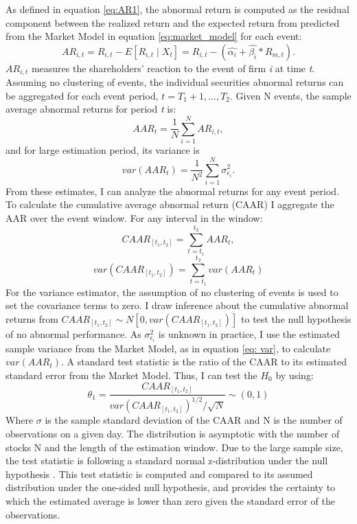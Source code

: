 As defined in equation \ref{eq:AR1}, the abnormal return is computed as the residual component between the realized return and the expected return from predicted from the Market Model in equation \ref{eq:market_model} for each event:
 \begin{equation}
    AR_{i,t} = R_{i,t} - E[R_{i,t} \mid X_t ] =  R_{i,t} - (\hat{\alpha_i} + \hat{\beta_i} * R_{m,t}).
    \label{eq: AR}
 \end{equation} 
$AR_{i,t}$ measures the shareholders' reaction to the event of firm \textit{i} at time \textit{t}. Assuming no clustering of events, the individual securities abnormal returns can be aggregated for each event period, $t = T_1 + 1, ..., T_2.$ Given N events, the sample average abnormal returns for period \textit{t} is:  
 \begin{equation}
 AAR_t = \frac{1}{N} \sum_{i=1} ^N AR_{i,t},
 \label{eq: AAR}
 \end{equation}
 and for large estimation period, its variance is
 \begin{equation}
 var(AAR_{t}) = \frac{1}{N^2} \sum_{i=1} ^N \sigma_{\epsilon_i} ^2.
  \label{eq: var}
 \end{equation}
From these estimates, I can analyze the abnormal returns for any event period. To calculate the cumulative average abnormal return (CAAR) I aggregate the AAR over the event window. For any interval in the window:
 \begin{equation}
 CAAR_{[t_1,t_2]} = \sum_{t = t_1} ^{t_2} AAR_{t},
 \label{eq: CAAR}
 \end{equation}
 \begin{equation}
 var(CAAR_{[t_1,t_2]}) = \sum^{t_2}_{t = t_1} var(AAR_{t})
 \end{equation} 
For the variance estimator, the assumption of no clustering of events is used to set the covariance terms to zero. I draw inference about the cumulative abnormal returns from $CAAR_{[t_1,t_2]} \sim N[0, var(CAAR_{[t_1,t_2]})]$ to test the null hypothesis of no abnormal performance. As $\sigma_{\epsilon_i} ^2$ is unknown in practice, I use the estimated sample variance from the Market Model, as in equation \ref{eq: var}, to calculate $ var(AAR_{t})$. A standard test statistic is the ratio of the CAAR to its estimated standard error from the Market Model. Thus, I can test the $H_0$ by using: 
 \begin{equation}
 \theta_1 = \frac{ CAAR_{[t_1,t_2]} }{ {var(CAAR_{[t_1,t_2]})}^{1/2} /\sqrt{N} } \sim(0,1)
 \label{eq: test_stat}
 \end{equation}
Where $\sigma$ is the sample standard deviation of the CAAR and N is the number of observations on a given day. The distribution is asymptotic with the number of stocks N and the length of the estimation window. Due to the large sample size, the test statistic is following a standard normal z-distribution under the null hypothesis \citep{Event_studies}. This test statistic is computed and compared to its assumed distribution under the one-sided null hypothesis, and provides the certainty to which the estimated average is lower than zero given the standard error of the observations. 

